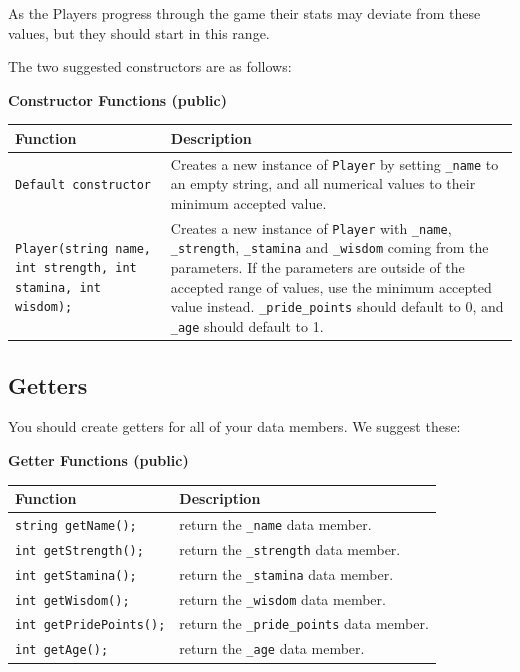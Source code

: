As the Players progress through the game their stats may deviate from these values, but they should start in this range.

The two suggested constructors are as follows:

\textbf{Constructor Functions (public)}

\renewcommand{\arraystretch}{1.5} 
\begin{longtable}{|p{2.0in}|p{4.0in}|}
\hline
\textbf{Function} & \textbf{Description} \\ \hline

\texttt{Default constructor} & Creates a new instance of \texttt{Player} by setting \texttt{_name} to an empty string, and all numerical values to their minimum accepted value. \\ \hline

\begin{verbatim}
Player(string name, int strength, int stamina, int wisdom);
\end{verbatim} 
& Creates a new instance of \texttt{Player} with \texttt{_name}, \texttt{_strength}, \texttt{_stamina} and \texttt{_wisdom} coming from the parameters. If the parameters are outside of the accepted range of values, use the minimum accepted value instead. \texttt{_pride_points} should default to 0, and \texttt{_age} should default to 1. \\ \hline

\end{longtable}

\subsection{Getters}

You should create getters for all of your data members. We suggest these:

\textbf{Getter Functions (public)}

\renewcommand{\arraystretch}{1.5} 
\begin{longtable}{|p{2.0in}|p{4.0in}|}
\hline
\textbf{Function} & \textbf{Description} \\ \hline

\texttt{string getName();} & return the \texttt{_name} data member.\\ \hline
\texttt{int getStrength();} & return the \texttt{_strength} data member.\\ \hline
\texttt{int getStamina();} & return the \texttt{_stamina} data member. \\ \hline
\texttt{int getWisdom();} & return the \texttt{_wisdom} data member.\\ \hline
\texttt{int getPridePoints();} & return the \texttt{_pride_points} data member.\\ \hline
\texttt{int getAge();} & return the \texttt{_age} data member.\\ \hline

\end{longtable}

